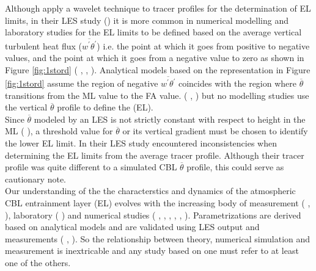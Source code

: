 Although \citeauthor{BrooksFowler2} apply a wavelet technique to tracer profiles for the determination of \acs{EL} limits, in their \acs{LES} study (\cite{BrooksFowler2}) it is more common in numerical modelling and laboratory studies for the \acs{EL} limits to be defined based on the average vertical turbulent heat flux ($\overline{w^{'}\theta^{'}}$) i.e. the point at which it goes from positive to negative values, and the point at which it goes from a negative value to zero as shown in Figure \ref{fig:1stord} (\citeauthor{DearWill80} \citeyear{DearWill80}, \citeauthor{FedConzMir04} \citeyear{FedConzMir04}, \citeauthor{GarciaMellado} \citeyear{GarciaMellado}). Analytical models based on the representation in Figure \ref{fig:1stord} assume the region of negative $\overline{w^{'}\theta^{'}}$ coincides with the region where $\overline{\theta}$ transitions from the \acs{ML} value to the \acs{FA} value. (\citeauthor{Deardorff79} \citeyear{Deardorff79}, \citeauthor{FedConzMir04} \citeyear{FedConzMir04}) but no modelling studies use the vertical $\overline{\theta}$ profile to define the (\acs{EL}).\\

Since $\overline{\theta}$ modeled by an \acs{LES} is not strictly constant with respect to height in the \acs{ML} (\citeauthor{FedConzMir04} \citeyear{FedConzMir04}), a threshold value for $\overline{\theta}$ or its vertical gradient must be chosen to identify the lower \acs{EL} limit.  In their \citeyear{BrooksFowler2} \acs{LES} study \citeauthor{BrooksFowler2} encountered inconsistencies when determining the \acs{EL} limits from the average tracer profile.  Although their tracer profile was quite different to a simulated \acs{CBL} $\overline{\theta}$ profile, this could serve as cautionary note.\\             

Our understanding of the the characterstics and dynamics of the atmospheric \acs{CBL} entrainment layer (\acs{EL}) evolves with the increasing body of measurement (\citeauthor{Traum11} \citeyear{Traum11}, \citeauthor{StullNelEl} \citeyear{StullNelEl}), laboratory (\citeauthor{DearWill80} \citeyear{DearWill80}) and numerical studies (\citeauthor{Deardorff72} \citeyear{Deardorff72}, \citeauthor{Sorbjan} \citeyear{Sorbjan}, \citeauthor{SullMoengStev} \citeyear{SullMoengStev}, \citeauthor{FedConzMir04} \citeyear{FedConzMir04}, \citeauthor{BrooksFowler2} \citeyear{BrooksFowler2}, \citeauthor{GarciaMellado} \citeyear{GarciaMellado}). Parametrizations are derived based on analytical models and are validated using \acs{LES} output and measurements (\citeauthor{FedConzMir04} \citeyear{FedConzMir04}, \citeauthor{Boers89} \citeyear{Boers89}).  So the relationship between theory, numerical simulation and measurement is inextricable and any study based on one must refer to at least one of the others.\\  

